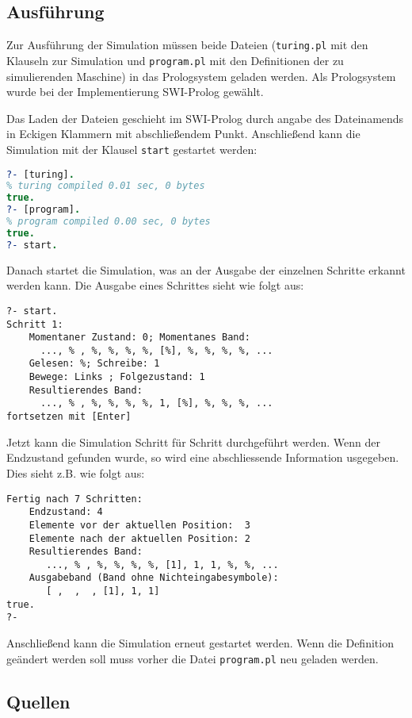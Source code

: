 \documentclass[final,a4paper,11pt,notitlepage,halfparskip]{scrreprt}
\begin{document}
\section{Ausführung}
Zur Ausführung der Simulation müssen beide Dateien (\texttt{turing.pl}
mit den Klauseln zur Simulation und \texttt{program.pl} mit den
Definitionen der zu simulierenden Maschine) in das Prologsystem geladen
werden. Als Prologsystem wurde bei der Implementierung SWI-Prolog
gewählt.  

Das Laden der Dateien geschieht im SWI-Prolog durch angabe des
Dateinamends in Eckigen Klammern mit abschließendem Punkt. Anschließend
kann die Simulation mit der Klausel \texttt{start} gestartet werden:
\begin{lstlisting}[language=Prolog]
?- [turing].
% turing compiled 0.01 sec, 0 bytes
true.
?- [program].
% program compiled 0.00 sec, 0 bytes
true.
?- start.
\end{lstlisting}
Danach startet die Simulation, was an der Ausgabe der einzelnen Schritte
erkannt werden kann. Die Ausgabe eines Schrittes sieht wie folgt aus:
\begin{lstlisting}[]
?- start.
Schritt 1:
    Momentaner Zustand: 0; Momentanes Band:
      ..., % , %, %, %, %, [%], %, %, %, %, ...
    Gelesen: %; Schreibe: 1
    Bewege: Links ; Folgezustand: 1
    Resultierendes Band: 
      ..., % , %, %, %, %, 1, [%], %, %, %, ...
fortsetzen mit [Enter]
\end{lstlisting}
Jetzt kann die Simulation Schritt für Schritt durchgeführt werden. Wenn
der Endzustand gefunden wurde, so wird eine abschliessende Information
usgegeben. Dies sieht z.B. wie folgt aus:
\begin{lstlisting}[]
Fertig nach 7 Schritten:
    Endzustand: 4
    Elemente vor der aktuellen Position:  3
    Elemente nach der aktuellen Position: 2
    Resultierendes Band:
       ..., % , %, %, %, %, [1], 1, 1, %, %, ...
    Ausgabeband (Band ohne Nichteingabesymbole):
       [ ,  ,  , [1], 1, 1]
true.
?- 
\end{lstlisting}
Anschließend kann die Simulation erneut gestartet werden. Wenn die
Definition geändert werden soll muss vorher die Datei
\texttt{program.pl} neu geladen werden.

\pagebreak
\begin{appendix}
    \chapter{Quellen}
    
    \pagebreak
    
\end{appendix}
\end{document}
